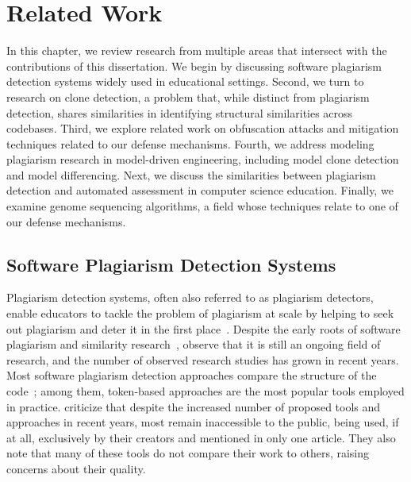 \chapter{Related Work}\label{cha:related-work}
In this chapter, we review research from multiple areas that intersect with the contributions of this dissertation.
We begin by discussing software plagiarism detection systems widely used in educational settings.
Second, we turn to research on clone detection, a problem that, while distinct from plagiarism detection, shares similarities in identifying structural similarities across codebases.
Third, we explore related work on obfuscation attacks and mitigation techniques related to our defense mechanisms.
Fourth, we address modeling plagiarism research in model-driven engineering, including model clone detection and model differencing.
Next, we discuss the similarities between plagiarism detection and automated assessment in computer science education.
Finally, we examine genome sequencing algorithms, a field whose techniques relate to one of our defense mechanisms.

\section{Software Plagiarism Detection Systems}
Plagiarism detection systems, often also referred to as plagiarism detectors, enable educators to tackle the problem of plagiarism at scale by helping to seek out plagiarism and deter it in the first place~\cite{Braumoeller2001}. 
Despite the early roots of software plagiarism and similarity research~\cite{Ottenstein1976}, \citet{Novak2019} observe that it is still an ongoing field of research, and the number of observed research studies has grown in recent years.
%
Most software plagiarism detection approaches compare the structure of the code~\cite{Nichols2019, Novak2019}; among them, token-based approaches are the most popular tools employed in practice.
\citet{Novak2019} criticize that despite the increased number of proposed tools and approaches in recent years, most remain inaccessible to the public, being used, if at all, exclusively by their creators and mentioned in only one article. They also note that many of these tools do not compare their work to others, raising concerns about their quality.

